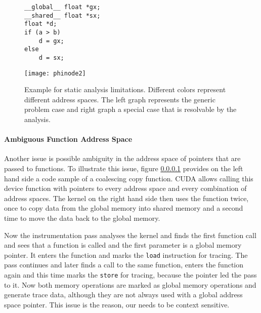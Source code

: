 \begin{figure}[t]
		\begin{minipage}{0.35\textwidth}

		\begin{lstlisting}[style=c]
__global__ float *gx;
__shared__ float *sx;
float *d;
if (a > b)
	d = gx;
else 
	d = sx;
		\end{lstlisting}
			\end{minipage}\hfill
	\begin{minipage}{0.6\textwidth}
		\centering
		\texttt{[image: phinode2]}
	\end{minipage}\hfill
	\caption{Example for static analysis limitations. Different colors represent different address spaces. The left graph represents the generic problem case and right graph a special case that is resolvable by the analysis.}
	\label{phinodes}
\end{figure}

\paragraph{Ambiguous Function Address Space}\label{func-vers}
Another issue is possible ambiguity in the address space of pointers that are passed to functions. To illustrate this issue, figure \ref{func-vers} provides on the left hand side a code sample of a coalescing copy function. CUDA allows calling this device function with pointers to every address space and every combination of address spaces. The kernel on the right hand side then uses the function twice, once to copy data from the global memory into shared memory and a second time to move the data back to the global memory.

Now the instrumentation pass analyses the kernel and finds the first function call and sees that a function is called and the first
parameter is a global memory pointer. It enters the function and marks the \verb|load| instruction for tracing. The pass continues and later finds a call to the same function, enters the function again and this time marks the \verb|store| for tracing, because the pointer
led the pass to it. Now both memory operations are marked as global memory operations and generate trace data, although they are not always used with a global address space pointer. This issue is the reason, our needs to be context sensitive.


